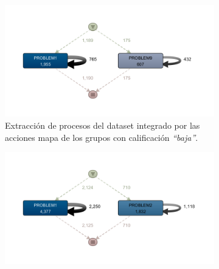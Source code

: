 \begin{figure}[H]
  \begin{subfigure}[t]{0.60\textwidth}
    \includegraphics[width=1.10\textwidth, height=0.80\textwidth]{imagenes/DISCO_map/Dataset FusionadoWorstGrades.png}
    \caption{Extracción de procesos del dataset integrado por las acciones mapa de los grupos con calificación \emph{``baja''}.}
    \label{fig:mapWorstGrades}
  \end{subfigure}
  \hfill
  \begin{subfigure}[t]{0.60\textwidth}
    \includegraphics[width=1.10\textwidth, height=0.80\textwidth]{imagenes/DISCO_map/Dataset FusionadoMidLowGrades.png}

\end{subfigure}
\end{figure}
